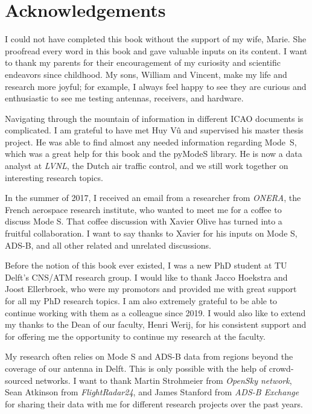 \chapter*{Acknowledgements}

\vspace{-0.3cm}

{
I could not have completed this book without the support of my wife, Marie. She proofread every word in this book and gave valuable inputs on its content. I want to thank my parents for their encouragement of my curiosity and scientific endeavors since childhood. My sons, William and Vincent, make my life and research more joyful; for example, I always feel happy to see they are curious and enthusiastic to see me testing antennas, receivers, and hardware.

Navigating through the mountain of information in different ICAO documents is complicated. I am grateful to have met Huy V\^u and supervised his master thesis project. He was able to find almost any needed information regarding Mode~S, which was a great help for this book and the pyModeS library. He is now a data analyst at \emph{LVNL}, the Dutch air traffic control, and we still work together on interesting research topics. 

In the summer of 2017, I received an email from a researcher from \emph{ONERA}, the French aerospace research institute, who wanted to meet me for a coffee to discuss Mode S. That coffee discussion with Xavier Olive has turned into a fruitful collaboration. I want to say thanks to Xavier for his inputs on Mode S, ADS-B, and all other related and unrelated discussions.

Before the notion of this book ever existed, I was a new PhD student at TU Delft's CNS/ATM research group. I would like to thank Jacco Hoekstra and Joost Ellerbroek, who were my promotors and provided me with great support for all my PhD research topics. I am also extremely grateful to be able to continue working with them as a colleague since 2019. I would also like to extend my thanks to the Dean of our faculty, Henri Werij, for his consistent support and for offering me the opportunity to continue my research at the faculty. 

My research often relies on Mode S and ADS-B data from regions beyond the coverage of our antenna in Delft. This is only possible with the help of crowd-sourced networks. I want to thank Martin Strohmeier from \emph{OpenSky network}, Sean Atkinson from \emph{FlightRadar24}, and James Stanford from \emph{ADS-B Exchange} for sharing their data with me for different research projects over the past years.

}
